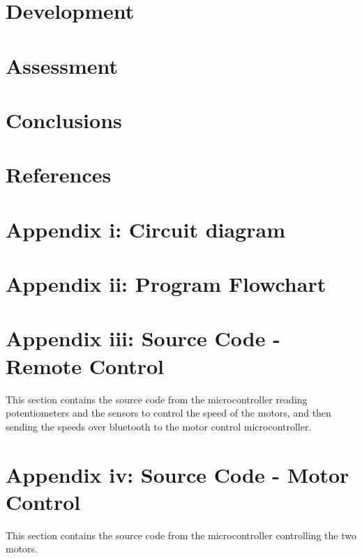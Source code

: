 \documentclass[a4paper,12pt]{article} %
\begin{document}
\section{Development} 


\section{Assessment} 


\section{Conclusions} 


\section{References}
 

\section{Appendix i: Circuit diagram} %

\section{Appendix ii: Program Flowchart} 


\clearpage
\section{Appendix iii: Source Code - Remote Control} %
This section contains the source code from the microcontroller reading potentiometers and the sensors to control the speed of the motors, and then sending the speeds over bluetooth to the motor control microcontroller.
\vspace{5mm}
\linespread{1}

\linespread{1.6}
\vspace{5mm}


\section{Appendix iv: Source Code - Motor Control} %
This section contains the source code from the microcontroller controlling the two motors.
\vspace{5mm}
\linespread{1}

\linespread{1.6}
\vspace{5mm}
\end{document}
